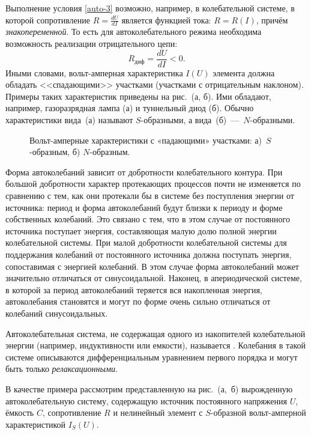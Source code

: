 Выполнение условия \eqref{auto-3} возможно, например, в 
колебательной системе, в которой сопротивление $R=\frac{dU}{dI}$ является 
функцией тока: $R=R(I)$, причём \emph{знакопеременной}. То есть для 
автоколебательного режима необходима возможность реализации
отрицательного  цепи:
\[
R_{диф} = \frac{dU}{dI} < 0.
\]
Иными словами, вольт-амперная характеристика $I(U)$ элемента должна
обладать <<спадающими>> участками (участками с отрицательным наклоном). 
Примеры таких характеристик приведены на
рис.~(а, б). Ими обладают, например, газоразрядная лампа 
(а) и туннельный диод (б). Обычно характеристики вида~(а) называют $S$-образными, 
а вида~(б)~---~$N$-образными.
\begin{figure}
	\centering
	\caption{Вольт-амперные характеристики с «падающими» участками: а)~$S$-образным, б) $N$-образным.}
\end{figure}

Форма автоколебаний зависит от добротности колебательного контура. При большой
добротности характер протекающих процессов почти не изменяется по сравнению с
тем, как они протекали бы в системе без поступления
энергии от источника: период и форма автоколебаний будут близки к периоду и
форме собственных колебаний. Это связано с тем, что в этом случае от постоянного
источника поступает энергия, составляющая малую
долю полной энергии колебательной системы. При малой добротности колебательной системы 
для поддержания колебаний от постоянного
источника должна поступать энергия, сопоставимая с энергией колебаний. В этом
случае форма автоколебаний может значительно отличаться от синусоидальной.
Наконец, в апериодической системе, в которой за период автоколебаний теряется вся
накопленная энергия, автоколебания становятся  и
могут по форме очень сильно отличаться от колебаний синусоидальных.

Автоколебательная система, не содержащая одного из накопителей колебательной
энергии (например, индуктивности или емкости), называется . Колебания в такой системе
описываются дифференциальным уравнением первого порядка и могут быть
только \emph{релаксационными}.

В качестве примера рассмотрим представленную на рис.~(а,~б) 
вырожденную автоколебательную систему, содержащую источник
постоянного напряжения $U$, ёмкость $C$, сопротивление $R$ и нелинейный элемент
с $S$-образной вольт-амперной характеристикой $I_S(U)$. 

